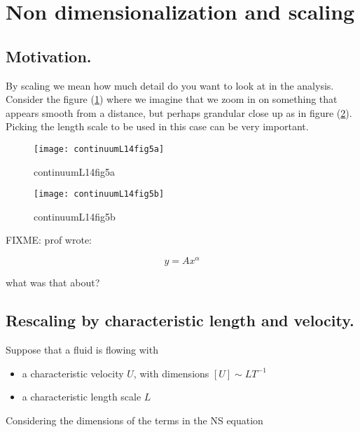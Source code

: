 \section{Non dimensionalization and scaling}

\subsection{Motivation.}

By scaling we mean how much detail do you want to look at in the analysis.  Consider the figure (\ref{fig:continuumL14:continuumL14fig5a}) where we imagine that we zoom in on something that appears smooth from a distance, but perhaps grandular close up as in figure (\ref{fig:continuumL14:continuumL14fig5b}).  Picking the length scale to be used in this case can be very important.

\begin{figure}[htp]
   \centering
   \texttt{[image: continuumL14fig5a]}
   \caption{continuumL14fig5a}\label{fig:continuumL14:continuumL14fig5a}
\end{figure}

\begin{figure}[htp]
   \centering
   \texttt{[image: continuumL14fig5b]}
   \caption{continuumL14fig5b}\label{fig:continuumL14:continuumL14fig5b}
\end{figure}

FIXME: prof wrote:

\begin{equation}\label{eqn:continuumL14:210}
y = A x^\alpha
\end{equation}

what was that about?

\subsection{Rescaling by characteristic length and velocity.}

Suppose that a fluid is flowing with

\begin{itemize}
\item a characteristic velocity $U$, with dimensions $[U] \sim L T^{-1}$
\item a characteristic length scale $L$
\end{itemize}

Considering the dimensions of the terms in the NS equation

